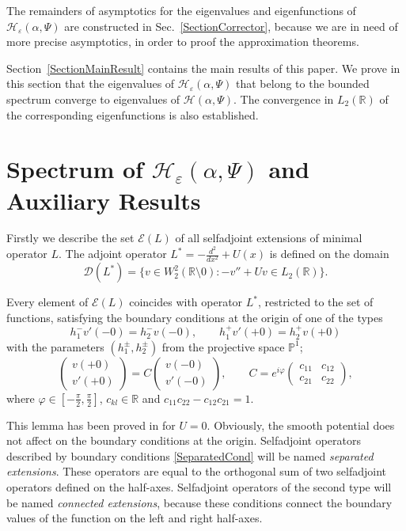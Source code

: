 \documentclass[11pt,english]{amsart}
\begin{document}
The remainders of asymptotics for the eigenvalues and eigenfunctions of $\mathcal{H}_\varepsilon(\alpha,\Psi)$ are constructed in Sec.~\ref{SectionCorrector}, because we are in need of more precise asymptotics, in order to proof the approximation theorems.

Section~\ref{SectionMainResult} contains the main results of this paper. We prove in this section that the eigenvalues of $\mathcal{H}_\varepsilon(\alpha,\Psi)$ that belong to the bounded spectrum converge to  eigenvalues of $\mathcal{H}(\alpha,\Psi)$. The convergence in $L_2(\mathbb R)$ of the corresponding eigenfunctions is also established.

\section{Spectrum of  $\mathcal{H}_\varepsilon(\alpha,\Psi)$ and  Auxiliary Results}\label{SectionSpectrumStructure}

Firstly we describe the set  $\mathcal{E}(L)$ of all selfadjoint extensions of  minimal operator $L$. The adjoint operator $L^*=-\frac{d^2}{dx^2}+U(x)$ is defined on the domain
$$
\mathcal{D}(L^*)=\{v\in W_2^2(\mathbb{R}\setminus 0)\colon -v''+Uv\in L_2(\mathbb{R})\}.
$$
\begin{g_lemma}\label{AllExtensionsLemma}
Every element of  $\mathcal{E}(L)$ coincides with operator $L^*$, restricted to the set of functions, satisfying the boundary conditions at the origin of one of the types
\begin{equation}\label{SeparatedCond}
      h_1^- v'(-0)=h_2^- v(-0),\qquad
      h_1^+ v'(+0)=h_2^+ v(+0)
\end{equation}
with the parameters $(h_1^\pm, h_2^\pm)$ from the projective space $\mathbb{P}^1$;
\begin{equation}\label{ConnectedCond}
\begin{pmatrix} v(+0) \\ v'(+0) \end{pmatrix}
=C\begin{pmatrix} v(-0) \\ v'(-0) \end{pmatrix},\qquad
C=e^{i\varphi}\begin{pmatrix} c_{11} & c_{12} \\ c_{21} & c_{22} \end{pmatrix},
\end{equation}
where $\varphi\in
[-\frac{\pi}{2},\frac{\pi}{2}]$, $c_{kl}\in\mathbb{R}$ and $c_{11}c_{22}-c_{12}c_{21}=1$.
\end{g_lemma}
This lemma has been proved in \cite{ChernoffHughesJFunctAnal93, SebaCzechJPhys86} for $U=0$.
Obviously, the smooth potential does not affect on the boundary conditions at the origin.
Selfadjoint operators described by  boundary conditions \eqref{SeparatedCond} will be named
\textit{separated extensions}. These operators are equal to the orthogonal sum of
two selfadjoint operators defined on the half-axes.
Selfadjoint ope\-ra\-tors of the second type will be named  \textit{connected extensions},
because these conditions connect the boundary values of the function on
the left and right half-axes.
\end{document}
